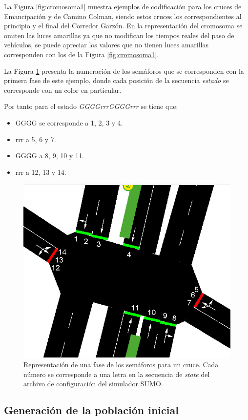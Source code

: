 La Figura \ref{fig:cromosoma1} muestra ejemplos de codificación para los cruces de Emancipación y de Camino Colman, siendo estos cruces los correspondientes al principio y el final del Corredor Garzón. En la representación del cromosoma se omiten las luces amarillas ya que no modifican los tiempos reales del paso de vehículos, se puede apreciar los valores que no tienen luces amarillas corresponden con los de la Figura \ref{fig:cromosoma1}.

La Figura \ref{fig:sem_numerados} presenta la numeración de los semáforos que se corresponden con la primera fase de este ejemplo, donde cada posición de la secuencia \emph{estado} se corresponde con un color en particular. 

\newpage
Por tanto para el estado \emph{GGGGrrrGGGGrrr} se tiene que:
\begin{itemize}
	\item GGGG se corresponde a 1, 2, 3 y 4. 
	\item rrr a 5, 6 y 7. 
	\item GGGG a 8, 9, 10 y 11. 
	\item rrr a 12, 13 y 14. 
\end{itemize}

\begin{figure}[H]
	\centering
	\includegraphics[width=0.7\linewidth]{Figures/semaforos_numerado}
	\caption[Representación de una fase de los semáforos para un cruce.]{Representación de una fase de los semáforos para un cruce. Cada número se corresponde a una letra en la secuencia de \emph{state} del archivo de configuración del simulador SUMO.}
	\label{fig:sem_numerados}
\end{figure}

\subsection{Generación de la población inicial}

